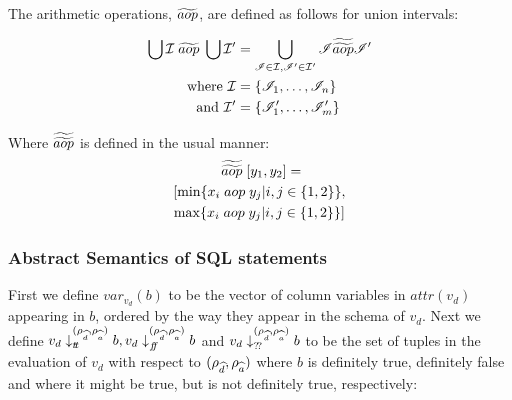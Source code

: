 The arithmetic operations, $\widetilde{aop}$, are defined as follows for union intervals:

\begin{align}\label{eq:abstractBOP}
    \bigcup \mathcal{I} \;\aab{aop}\; \bigcup \mathcal{I}' &= \bigcup_{\mathscr{I}\in \mathcal{I}, \mathscr{I}'\in \mathcal{I}'}\mathscr{I}\aaab{aop}\mathscr{I}'\nonumber\\
    \text{where } \mathcal{I}&=\{\mathscr{I}_1,\dots,\mathscr{I}_n\}\nonumber\\
    \text{and } \mathcal{I}'&=\{\mathscr{I}'_1,\dots,\mathscr{I}'_m\}
\end{align}

Where $\widetilde{\widetilde{aop}}$ is defined in the usual manner:
\begin{multline}
    [x_1, x_2] \; \aaab{aop} \; [y_1, y_2] = \\
    [\min\{x_i \; aop \; y_j | i,j \in \{1, 2\}\}, \\
    \max\{x_i \; aop \; y_j | i,j \in \{1, 2\}\}]
\end{multline}

\subsubsection{Abstract Semantics of SQL statements}\label{subsubsec:abstract-semantics-sql-statements}

First we define $var_{v_d}(b)$ to be the vector of column variables in $attr(v_d)$ appearing in $b$, ordered by the way they appear in the schema of $v_d$.
Next we define $v_d \downarrow_{t\!t}^{(\rho_{\widehat{d}}, \rho_{\widehat{a}})} b, v_d \downarrow_{f\!\!f}^{(\rho_{\widehat{d}}, \rho_{\widehat{a}})} b$ and  $v_d \downarrow_{?\!?}^{(\rho_{\widehat{d}}, \rho_{\widehat{a}})} b$ to be the set of tuples in the evaluation of $v_d$ with respect to $(\rho_{\widehat{d}}, \rho_{\widehat{a}})$ where $b$ is definitely true, definitely false and where it might be true, but is not definitely true, respectively:

